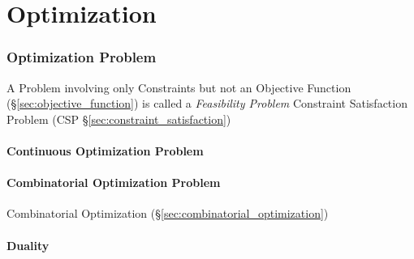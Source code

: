 \part{Optimization}\label{part:optimization}

\section{Optimization Problem}\label{sec:optimization_problem}

A Problem involving only Constraints but not an Objective Function
(\S\ref{sec:objective_function}) is called a \emph{Feasibility Problem} \fist
Constraint Satisfaction Problem (CSP \S\ref{sec:constraint_satisfaction})



\subsection{Continuous Optimization Problem}
\label{sec:continuous_optimization_problem}

\subsection{Combinatorial Optimization Problem}
\label{sec:combinatorial_optimization_problem}

\fist Combinatorial Optimization (\S\ref{sec:combinatorial_optimization})



\subsection{Duality}\label{sec:optimization_duality}

